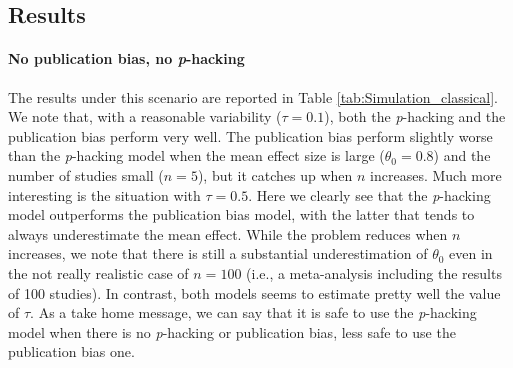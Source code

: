 \documentclass[preprint, authoryear]{elsarticle}
\theoremstyle{plain}
\theoremstyle{definition}
\begin{document}
\subsection{Results}
\paragraph{No publication bias, no \emph{p}-hacking} The results under this scenario are reported in Table \ref{tab:Simulation_classical}. We note that, with a reasonable variability ($\tau = 0.1$), both the \emph{p}-hacking and the publication bias perform very well. The publication bias perform slightly worse than the \emph{p}-hacking model when the mean effect size is large ($\theta_0 = 0.8$) and the number of studies small ($n=5$), but it catches up when $n$ increases. Much more interesting is the situation with $\tau = 0.5$. Here we clearly see that the \emph{p}-hacking model outperforms the publication bias model, with the latter that tends to always underestimate the mean effect. While the problem reduces when $n$ increases, we note that there is still a substantial underestimation of $\theta_0$ even in the not really realistic case of $n = 100$ (i.e., a meta-analysis including the results of 100 studies). In contrast, both models seems to estimate pretty well the value of $\tau$. As a take home message, we can say that it is safe to use the \emph{p}-hacking model when there is no \emph{p}-hacking or publication bias, less safe to use the publication bias one.
\end{document}
